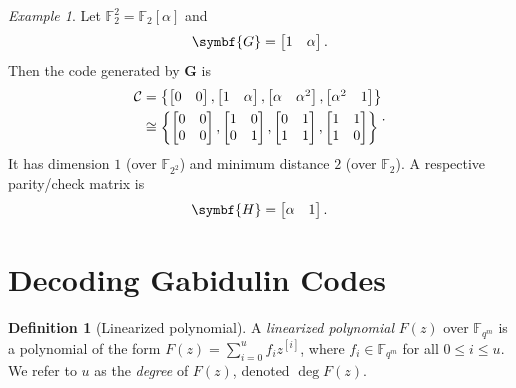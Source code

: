 \documentclass[version=last, paper=A4, parskip=half, oneside]{scrbook}
\theoremstyle{plain}
\theoremstyle{definition}
\newtheorem{definition}{Definition}
\theoremstyle{remark}
\newtheorem*{example}{Example}
\newcommand*{\mat}{\symbf}
\newcommand*{\FF}{\ensuremath{\mathbb{F}}}
\begin{document}
\begin{example}
  Let \(\FF_2^2 = \FF_2[\alpha]\) and
  \[
    \mat{G} = \begin{bmatrix} 1 & \alpha \end{bmatrix}\text.
  \]
  Then the code generated by \(\mat{G}\) is
  \[
    \begin{aligned}
      \mathcal{C} &=
      \left\{
        \begin{bmatrix} 0 & 0 \end{bmatrix},
        \begin{bmatrix} 1 & \alpha \end{bmatrix},
        \begin{bmatrix} \alpha & \alpha^2 \end{bmatrix},
        \begin{bmatrix} \alpha^2 & 1 \end{bmatrix}
      \right\} \\
      &\cong
      \left\{
        \begin{bmatrix} 0 & 0 \\ 0 & 0 \end{bmatrix},
        \begin{bmatrix} 1 & 0 \\ 0 & 1 \end{bmatrix},
        \begin{bmatrix} 0 & 1 \\ 1 & 1 \end{bmatrix},
        \begin{bmatrix} 1 & 1 \\ 1 & 0 \end{bmatrix}
      \right\}
    \end{aligned}\text.
  \]
  It has dimension \(1\) (over \(\FF_{2^2}\)) and minimum distance \(2\) (over
  \(\FF_2\)).  A respective parity\-/check matrix is
  \[
    \mat{H} = \begin{bmatrix} \alpha & 1 \end{bmatrix}\text.
  \]
\end{example}

\section{Decoding Gabidulin Codes}\label{sec:gabidulin-code-decoding}

\begin{definition}[Linearized polynomial]
  A \emph{linearized polynomial} \(F(z)\) over \(\FF_{q^m}\) is a polynomial of
  the form \(F(z) = \sum_{i = 0}^u f_i z^{[i]}\), where \(f_i \in \FF_{q^m}\)
  for all \(0 \le i \le u\).  We refer to \(u\) as the \emph{degree} of
  \(F(z)\), denoted \(\deg F(z)\).
\end{definition}
\end{document}
